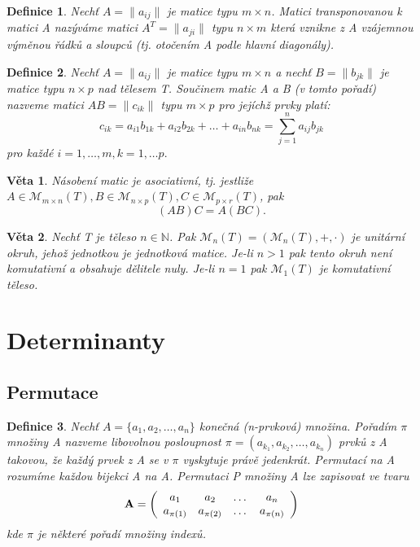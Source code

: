 \documentclass[12pt,a4paper]{article}
\newtheorem{definition}{Definice}
\newtheorem{sentence}{Věta}
\begin{document}
\begin{definition}
	Nechť $A= \| a_{ij} \|$ je matice typu $m \times n$. Matici transponovanou k matici A nazýváme matici $A^T = \| a_{ji} \|$ typu $n \times m$ která vznikne z A vzájemnou výměnou řádků a sloupců (tj. otočením A podle hlavní diagonály).
\end{definition}

\begin{definition}
	Nechť $A= \| a_{ij} \|$ je matice typu $m \times n$ a nechť $B= \| b_{jk} \|$ je matice typu $n \times p$  nad tělesem T. Součinem matic A a B (v tomto pořadí) nazveme matici $AB =  \| c_{ik} \|$ typu $m \times p$ pro jejíchž prvky platí: $$c_{ik} = a_{i1}b_{1k} + a_{i2}b_{2k} + \dots + a_{in}b_{nk} = \sum^n_{j=1} a_{ij}b_{jk}$$
	pro každé $i = 1, \dots, m, k = 1, \dots p.$
\end{definition}

\begin{sentence}
	Násobení matic je asociativní, tj. jestliže $A \in \mathscr{M}_{m \times n}(T), B \in \mathscr{M}_{n \times p}(T), C \in \mathscr{M}_{p \times r}(T)$, pak $$(AB)C = A(BC).$$
\end{sentence}

\begin{sentence}
	Nechť T je těleso $n \in \mathbb{N}$. Pak $ \mathscr{M}_{n}(T) = (\mathscr{M}_{n}(T) ,+,\cdot)$ je unitární okruh, jehož jednotkou je jednotková matice. Je-li $n > 1$ pak tento okruh není komutativní a obsahuje dělitele nuly. Je-li $n = 1$ pak $\mathscr{M}_{1}(T)$  je komutativní těleso.
\end{sentence}

\section{Determinanty}

\subsection{Permutace}
\begin{definition}
Nechť $A = \{a_1,a_2, \dots, a_n\}$ konečná (n-prvková) množina. Pořadím $\pi$ množiny A nazveme libovolnou posloupnost $\pi = (a_{k_1},a_{k_2}, \dots, a_{k_n})$ prvků z A takovou, že každý prvek z A se v $\pi$ vyskytuje právě jedenkrát. Permutací na A rozumíme každou bijekci A na A. Permutaci P množiny A lze zapisovat ve tvaru
\begin{displaymath}
{\bf A} =
\left( \begin{array}{cccc}
a_{1} & a_{2} & \dots & a_{n} \\
a_{\pi (1)} & a_{\pi (2)} & \dots & a_{\pi (n)} \\

\end{array} \right)
\end{displaymath}
kde $\pi$ je některé pořadí množiny indexů.
\end{definition}
\end{document}
